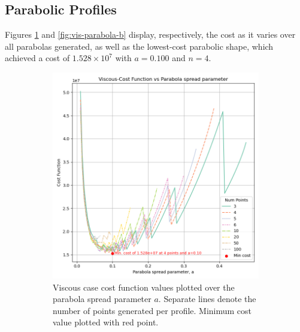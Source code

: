 \documentclass[11pt]{article}
\begin{document}
\subsection{Parabolic Profiles}
 Figures \ref{fig:vis-parabola-a} and \ref{fig:vis-parabola-b} display, respectively, the cost as it varies over all parabolas generated, as well as the lowest-cost parabolic shape, which achieved a cost of $1.528 \times 10^7$ with $a=0.100$ and $n=4$.
\begin{figure}[H]
\centering
\begin{subfigure}[b]{0.45\textwidth}
    \centering
    \includegraphics[width=\linewidth]{../results/viscous/parabolas.png}
    \caption{Viscous case cost function values plotted over the parabola spread parameter $a$. Separate lines denote the number of points generated per profile. Minimum cost value plotted with red point.}
    \label{fig:vis-parabola-a}
\end{subfigure}
\hfill
\begin{subfigure}[b]{0.45\textwidth}
    \centering

\end{subfigure}
\end{figure}
\end{document}
